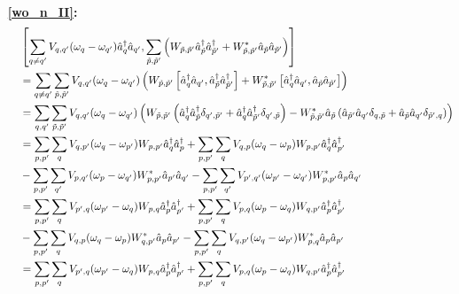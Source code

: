 \begin{appendix}
\begin{itemize}
\begin{align}
\end{align}
\item [\textbf{\ref{wo_n_II}:}]
\begin{align}
&\left[\Sum_{q\neq q^\prime}V_{q,q^\prime}(\omega_q-\omega_{q^\prime})\CR_q\AN_{q^\prime},\Sum_{\tilde p,\tilde p^\prime}\left(W_{\tilde p,\tilde p^\prime}\CR_{\tilde p}\CR_{\tilde p^\prime}+W_{\tilde p,\tilde p^\prime}^*\AN_{\tilde p}\AN_{\tilde p^\prime}\right)\right] \nonumber \\ \quad&
= \Sum_{q\neq q^\prime}\Sum_{\tilde p,\tilde p^\prime}V_{q,q^\prime}(\omega_q-\omega_{q^\prime})\left(W_{\tilde p,\tilde p^\prime}\left[\CR_q\AN_{q^\prime},\CR_{\tilde p}\CR_{\tilde p^\prime}\right]+W_{\tilde p,\tilde p^\prime}^*\left[\CR_q\AN_{q^\prime},\AN_{\tilde p}\AN_{\tilde p^\prime}\right]\right)\nonumber \\ \quad& 
= \Sum_{q,q^\prime}\Sum_{\tilde p,\tilde p^\prime}V_{q,q^\prime}(\omega_q-\omega_{q^\prime})\left(W_{\tilde p,\tilde p^\prime}\left(\CR_q\CR_{\tilde p}\delta_{q^\prime,\tilde p^\prime}+ \CR_q\CR_{\tilde p^\prime}\delta_{q^\prime,\tilde p}\right)-W_{\tilde p,\tilde p^\prime}^*\AN_{\tilde p}\left(\AN_{\tilde p^\prime}\AN_{q^\prime}\delta_{q,\tilde p}+\AN_{\tilde p}\AN_{q^\prime}\delta_{\tilde p^\prime,q}\right)\right)\nonumber \\ \quad&
= \Sum_{ p, p^\prime}\Sum_{q}V_{q,p^\prime}(\omega_q-\omega_{p^\prime}) W_{ p, p^\prime}\CR_q\CR_{ p}
+\Sum_{ p, p^\prime}\Sum_{q}V_{q,p}(\omega_q-\omega_{p}) W_{ p, p^\prime} \CR_q\CR_{ p^\prime} \nonumber \\ \quad& 
-\Sum_{ p, p^\prime}\Sum_{q^\prime}V_{p,q^\prime}(\omega_p-\omega_{q^\prime}) W_{ p, p^\prime}^* \AN_{ p^\prime}\AN_{q^\prime}
-\Sum_{ p, p^\prime}\Sum_{q^\prime}V_{p^\prime,q^\prime}(\omega_{p^\prime}-\omega_{q^\prime}) W_{ p, p^\prime}^* \AN_{ p}\AN_{q^\prime} \nonumber \\ \quad& 
= \Sum_{ p, p^\prime}\Sum_{q}V_{{p^\prime},q}(\omega_{p^\prime}-\omega_{q}) W_{ p, q}\CR_{ p}\CR_{p^\prime}
+\Sum_{ p, p^\prime}\Sum_{q}V_{p,q}(\omega_p-\omega_{q}) W_{ q, p^\prime} \CR_p\CR_{ p^\prime} \nonumber \\ \quad& 
-\Sum_{ p, p^\prime}\Sum_{q}V_{q,p}(\omega_{q}-\omega_{p}) W_{ q, p^\prime}^* \AN_{p}\AN_{ p^\prime}
-\Sum_{ p, p^\prime}\Sum_{q}V_{q,p^\prime}(\omega_{q}-\omega_{p^\prime}) W_{ p, {q}}^* \AN_{ p}\AN_{p^\prime} \nonumber \\ \quad& 
= \Sum_{ p, p^\prime}\Sum_{q}V_{{p^\prime},q}(\omega_{p^\prime}-\omega_{q}) W_{ p, q}\CR_{ p}\CR_{p^\prime}
+\Sum_{ p, p^\prime}\Sum_{q}V_{p,q}(\omega_p-\omega_{q}) W_{ q, p^\prime} \CR_p\CR_{ p^\prime} \nonumber \\ \quad& 

\end{align}
\end{itemize}
\end{appendix}
